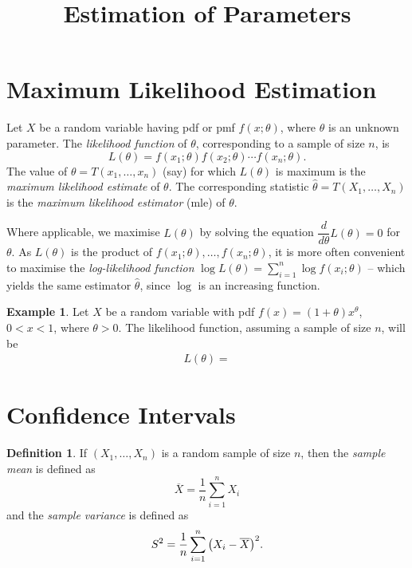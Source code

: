 \documentclass[svgnames, a5paper]{article}
\theoremstyle{definition}
\newtheorem{Definition}[Theorem]{Definition}
\newtheorem{Example}[Theorem]{Example}
\theoremstyle{remark}
\begin{document}
\title{\textbf{Estimation of Parameters}}

\date{}
\maketitle


\section{Maximum Likelihood Estimation}\label{sec:MLE}

Let $X$ be a random variable having pdf or pmf $f(x; \theta)$, where $\theta$ is an unknown parameter. The \emph{likelihood function} of $\theta$, corresponding to a sample of size $n$, is
\begin{equation*}
L(\theta) = f(x_1; \theta) f(x_2; \theta) \cdots f(x_n; \theta).
\end{equation*}
The value of $\theta = T(x_1, \ldots, x_n)$ (say) for which $L(\theta)$ is maximum is the \emph{maximum likelihood estimate} of $\theta$. The corresponding statistic $\hat\theta = T(X_1, \ldots, X_n)$ is the \emph{maximum likelihood estimator} (mle) of $\theta$.

Where applicable, we maximise $L(\theta)$ by solving the equation $\dfrac{d}{d\theta} L(\theta) = 0$ for $\theta$. As $L(\theta)$ is the product of $f(x_1; \theta), \ldots, f(x_n; \theta)$, it is more often convenient to maximise the \emph{log-likelihood function} $\log L(\theta) = \sum_{i=1}^{n} \log f(x_i; \theta)$ -- which yields the same estimator $\hat\theta$, since $\log$ is an increasing function.

\begin{Example}
Let $X$ be a random variable with pdf $f(x) = (1 + \theta) x^{\theta}$, $0 < x < 1$, where $\theta > 0$. The likelihood function, assuming a sample of size $n$, will be
\begin{align*}
L(\theta) = 
\end{align*}
\end{Example} 

\section{Confidence Intervals}\label{sec:CI}

\begin{Definition}
If $(X_1, \ldots, X_n)$ is a random sample of size $n$, then the \emph{sample mean} is defined as
\begin{equation*}
\overline X = \dfrac 1 n \sum_{i = 1}^n X_i
\end{equation*}
and the \emph{sample variance} is defined as
\begin{equation*}
S^2 = \dfrac 1 n \sum_{i = 1}^n \pqty{X_i - \overline X}^2.
\end{equation*}
\end{Definition}
\end{document}
